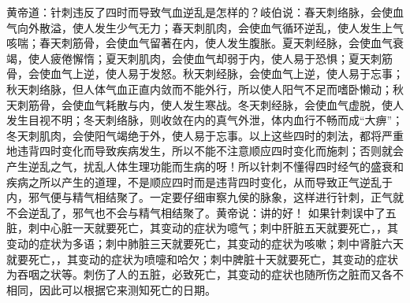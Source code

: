 \documentclass[a4paper,12pt,UTF8,twoside]{ctexbook}
\begin{document}
黄帝道：针刺违反了四时而导致气血逆乱是怎样的？岐伯说：春天刺络脉，会使血气向外散溢，使人发生少气无力；春天刺肌肉，会使血气循环逆乱，使人发生上气咳喘；春天刺筋骨，会使血气留著在内，使人发生腹胀。夏天刺经脉，会使血气衰竭，使人疲倦懈惰；夏天刺肌肉，会使血气却弱于内，使人易于恐惧；夏天刺筋骨，会使血气上逆，使人易于发怒。秋天刺经脉，会使血气上逆，使人易于忘事；秋天刺络脉，但人体气血正直内敛而不能外行，所以使人阳气不足而嗜卧懒动；秋天刺筋骨，会使血气耗散与内，使人发生寒战。冬天刺经脉，会使血气虚脱，使人发生目视不明；冬天刺络脉，则收敛在内的真气外泄，体内血行不畅而成“大痹”；冬天刺肌肉，会使阳气竭绝于外，使人易于忘事。以上这些四时的刺法，都将严重地违背四时变化而导致疾病发生，所以不能不注意顺应四时变化而施刺；否则就会产生逆乱之气，扰乱人体生理功能而生病的呀！所以针刺不懂得四时经气的盛衰和疾病之所以产生的道理，不是顺应四时而是违背四时变化，从而导致正气逆乱于内，邪气便与精气相结聚了。一定要仔细审察九侯的脉象，这样进行针刺，正气就不会逆乱了，邪气也不会与精气相结聚了。黄帝说：讲的好！
如果针刺误中了五脏，刺中心脏一天就要死亡，其变动的症状为噫气；刺中肝脏五天就要死亡，，其变动的症状为多语；刺中肺脏三天就要死亡，其变动的症状为咳嗽；刺中肾脏六天就要死亡，，其变动的症状为喷嚏和哈欠；刺中脾脏十天就要死亡，其变动的症状为吞咽之状等。刺伤了人的五脏，必致死亡，其变动的症状也随所伤之脏而又各不相同，因此可以根据它来测知死亡的日期。
\end{document}
